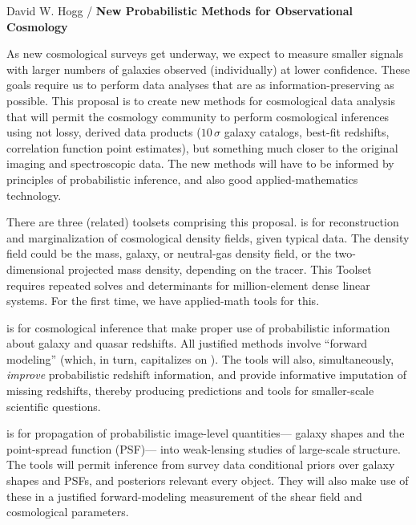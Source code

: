 \documentclass[12pt]{article}
\begin{document}
\sloppy\sloppypar\thispagestyle{empty}

\noindent
\textsf{David W. Hogg / \textbf{New Probabilistic Methods for Observational Cosmology}} %
\smallskip

As new cosmological surveys get underway,
we expect to measure smaller signals with larger numbers of galaxies
observed (individually) at lower confidence.
These goals require us to perform data
analyses that are as information-preserving as possible.
This proposal is to create new methods for cosmological data analysis
that will permit the cosmology community to perform cosmological
inferences using not lossy, derived data products ($10\,\sigma$ galaxy
catalogs, best-fit redshifts, correlation function point estimates),
but something much closer to the original imaging and spectroscopic
data.
The new methods will have to be informed by principles of
probabilistic inference, and also good applied-mathematics technology.

There are three (related) toolsets comprising this proposal.
 is for reconstruction and marginalization
of cosmological density fields, given typical data.
The density field could be the mass, galaxy, or 
neutral-gas density field, or the two-dimensional projected mass density,
depending on the tracer.
This Toolset requires repeated solves and determinants for
million-element dense linear systems.  For the first time, we
have applied-math tools for this.

 is for cosmological inference that make proper
use of probabilistic information about galaxy and quasar redshifts.
All justified methods involve ``forward modeling'' (which, in turn,
capitalizes on ).  The tools will also, simultaneously,
\emph{improve} probabilistic redshift information, and provide
informative imputation of missing redshifts, thereby producing
predictions and tools for smaller-scale scientific questions.

 is for propagation of probabilistic image-level quantities---%
galaxy shapes and the point-spread function (PSF)---%
into weak-lensing studies of large-scale structure.
The tools will permit inference from survey data conditional priors over
galaxy shapes and PSFs, and posteriors relevant every object.
They will also make use of these in a justified forward-modeling
measurement of the shear field and cosmological parameters.
\end{document}
